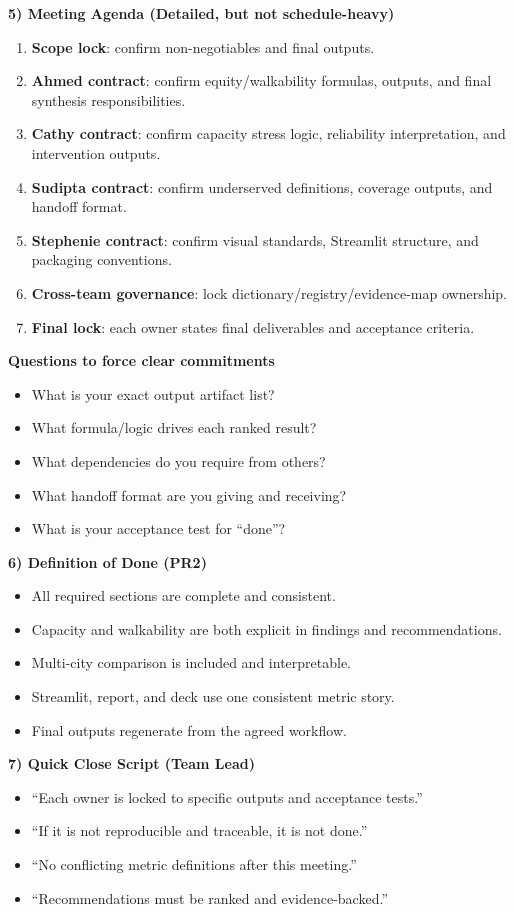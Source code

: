 \documentclass[10pt,letterpaper,twocolumn]{article}
\newcommand{\sectiontitle}[1]{\vspace{0.35em}\textbf{\large #1}\vspace{0.15em}}
\newcommand{\subhead}[1]{\textbf{#1}}
\begin{document}
\sectiontitle{5) Meeting Agenda (Detailed, but not schedule-heavy)}
\begin{enumerate}
  \item \textbf{Scope lock}: confirm non-negotiables and final outputs.
  \item \textbf{Ahmed contract}: confirm equity/walkability formulas, outputs, and final synthesis responsibilities.
  \item \textbf{Cathy contract}: confirm capacity stress logic, reliability interpretation, and intervention outputs.
  \item \textbf{Sudipta contract}: confirm underserved definitions, coverage outputs, and handoff format.
  \item \textbf{Stephenie contract}: confirm visual standards, Streamlit structure, and packaging conventions.
  \item \textbf{Cross-team governance}: lock dictionary/registry/evidence-map ownership.
  \item \textbf{Final lock}: each owner states final deliverables and acceptance criteria.
\end{enumerate}

\subhead{Questions to force clear commitments}
\begin{itemize}
  \item What is your exact output artifact list?
  \item What formula/logic drives each ranked result?
  \item What dependencies do you require from others?
  \item What handoff format are you giving and receiving?
  \item What is your acceptance test for ``done''?
\end{itemize}

\sectiontitle{6) Definition of Done (PR2)}
\begin{itemize}
  \item All required sections are complete and consistent.
  \item Capacity and walkability are both explicit in findings and recommendations.
  \item Multi-city comparison is included and interpretable.
  \item Streamlit, report, and deck use one consistent metric story.
  \item Final outputs regenerate from the agreed workflow.
\end{itemize}

\sectiontitle{7) Quick Close Script (Team Lead)}
\begin{itemize}
  \item ``Each owner is locked to specific outputs and acceptance tests.''
  \item ``If it is not reproducible and traceable, it is not done.''
  \item ``No conflicting metric definitions after this meeting.''
  \item ``Recommendations must be ranked and evidence-backed.''
\end{itemize}
\end{document}
